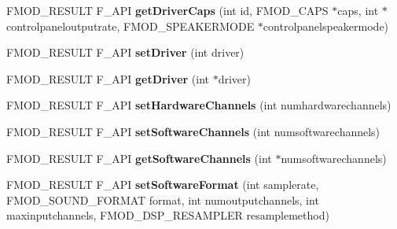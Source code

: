 \begin{DoxyCompactItemize}
\item 
\hypertarget{class_f_m_o_d_1_1_system_a94c535029424ae1b1416c7484683a783}{F\-M\-O\-D\-\_\-\-R\-E\-S\-U\-L\-T F\-\_\-\-A\-P\-I {\bfseries get\-Driver\-Caps} (int id, F\-M\-O\-D\-\_\-\-C\-A\-P\-S $\ast$caps, int $\ast$controlpaneloutputrate, F\-M\-O\-D\-\_\-\-S\-P\-E\-A\-K\-E\-R\-M\-O\-D\-E $\ast$controlpanelspeakermode)}\label{class_f_m_o_d_1_1_system_a94c535029424ae1b1416c7484683a783}

\item 
\hypertarget{class_f_m_o_d_1_1_system_a2ce18295f0e062054e1f8b9421788683}{F\-M\-O\-D\-\_\-\-R\-E\-S\-U\-L\-T F\-\_\-\-A\-P\-I {\bfseries set\-Driver} (int driver)}\label{class_f_m_o_d_1_1_system_a2ce18295f0e062054e1f8b9421788683}

\item 
\hypertarget{class_f_m_o_d_1_1_system_aeba7030e04c4604da112264e3ddbb8e6}{F\-M\-O\-D\-\_\-\-R\-E\-S\-U\-L\-T F\-\_\-\-A\-P\-I {\bfseries get\-Driver} (int $\ast$driver)}\label{class_f_m_o_d_1_1_system_aeba7030e04c4604da112264e3ddbb8e6}

\item 
\hypertarget{class_f_m_o_d_1_1_system_a0b4f6c60505418445a9d8607ac00fca1}{F\-M\-O\-D\-\_\-\-R\-E\-S\-U\-L\-T F\-\_\-\-A\-P\-I {\bfseries set\-Hardware\-Channels} (int numhardwarechannels)}\label{class_f_m_o_d_1_1_system_a0b4f6c60505418445a9d8607ac00fca1}

\item 
\hypertarget{class_f_m_o_d_1_1_system_ad12789aa16134fb66520aca1cb1419c6}{F\-M\-O\-D\-\_\-\-R\-E\-S\-U\-L\-T F\-\_\-\-A\-P\-I {\bfseries set\-Software\-Channels} (int numsoftwarechannels)}\label{class_f_m_o_d_1_1_system_ad12789aa16134fb66520aca1cb1419c6}

\item 
\hypertarget{class_f_m_o_d_1_1_system_a210d30f8df72c80d31bc38f5a8e116d0}{F\-M\-O\-D\-\_\-\-R\-E\-S\-U\-L\-T F\-\_\-\-A\-P\-I {\bfseries get\-Software\-Channels} (int $\ast$numsoftwarechannels)}\label{class_f_m_o_d_1_1_system_a210d30f8df72c80d31bc38f5a8e116d0}

\item 
\hypertarget{class_f_m_o_d_1_1_system_a1ad691b00d940df85a4bb1718fbf42e2}{F\-M\-O\-D\-\_\-\-R\-E\-S\-U\-L\-T F\-\_\-\-A\-P\-I {\bfseries set\-Software\-Format} (int samplerate, F\-M\-O\-D\-\_\-\-S\-O\-U\-N\-D\-\_\-\-F\-O\-R\-M\-A\-T format, int numoutputchannels, int maxinputchannels, F\-M\-O\-D\-\_\-\-D\-S\-P\-\_\-\-R\-E\-S\-A\-M\-P\-L\-E\-R resamplemethod)}\label{class_f_m_o_d_1_1_system_a1ad691b00d940df85a4bb1718fbf42e2}


\end{DoxyCompactItemize}
